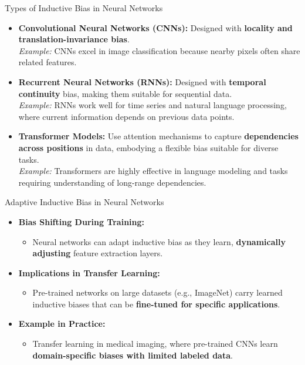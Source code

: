 \documentclass[serif, aspectratio=169]{beamer}
\begin{document}
\begin{frame}{Types of Inductive Bias in Neural Networks}
    \begin{itemize}
        \item \textbf{Convolutional Neural Networks (CNNs):} Designed with \textbf{locality and translation-invariance bias}. \\
              \textit{Example:} CNNs excel in image classification because nearby pixels often share related features.
              
        \item \textbf{Recurrent Neural Networks (RNNs):} Designed with \textbf{temporal continuity} bias, making them suitable for sequential data. \\
              \textit{Example:} RNNs work well for time series and natural language processing, where current information depends on previous data points.
              
        \item \textbf{Transformer Models:} Use attention mechanisms to capture \textbf{dependencies across positions} in data, embodying a flexible bias suitable for diverse tasks. \\
                            \textit{Example:} Transformers are highly effective in language modeling and tasks requiring understanding of long-range dependencies.

    \end{itemize}
\end{frame}


\begin{frame}{Adaptive Inductive Bias in Neural Networks}
    \begin{itemize}
        \item \textbf{Bias Shifting During Training:}
            \begin{itemize}
                \item Neural networks can adapt inductive bias as they learn, \textbf{dynamically adjusting} feature extraction layers.
            \end{itemize}
        \item \textbf{Implications in Transfer Learning:}
            \begin{itemize}
                \item Pre-trained networks on large datasets (e.g., ImageNet) carry learned inductive biases that can be \textbf{fine-tuned for specific applications}.
            \end{itemize}
        \item \textbf{Example in Practice:}
            \begin{itemize}
                \item Transfer learning in medical imaging, where pre-trained CNNs learn \textbf{domain-specific biases with limited labeled data}.
            \end{itemize}
    \end{itemize}
\end{frame}
\end{document}
